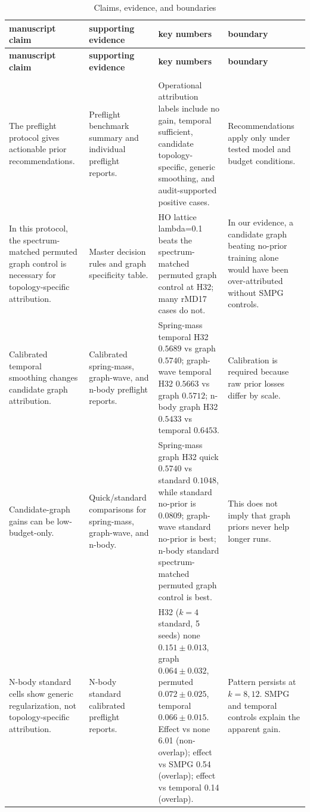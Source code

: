 \documentclass[preprint,12pt]{elsarticle}
\begin{document}
\begingroup
\scriptsize
\setlength{\tabcolsep}{3pt}
\renewcommand{\arraystretch}{1.08}
\begin{longtable}{>{\raggedright\arraybackslash}p{}>{\raggedright\arraybackslash}p{}>{\raggedright\arraybackslash}p{}>{\raggedright\arraybackslash}p{}}
\caption{Claims, evidence, and boundaries}\label{tab:claims-evidence}\\
\toprule
\textbf{manuscript claim} & \textbf{supporting evidence} & \textbf{key numbers} & \textbf{boundary} \\
\midrule
\endfirsthead
\toprule
\textbf{manuscript claim} & \textbf{supporting evidence} & \textbf{key numbers} & \textbf{boundary} \\
\midrule
\endhead
\midrule
\multicolumn{4}{r}{\emph{Continued on next page}} \\
\midrule
\endfoot
\bottomrule
\endlastfoot
The preflight protocol gives actionable prior recommendations. & Preflight benchmark summary and individual preflight reports. & Operational attribution labels include no gain, temporal sufficient, candidate topology-specific, generic smoothing, and audit-supported positive cases. & Recommendations apply only under tested model and budget conditions. \\
In this protocol, the spectrum-matched permuted graph control is necessary for topology-specific attribution. & Master decision rules and graph specificity table. & HO lattice lambda=0.1 beats the spectrum-matched permuted graph control at H32; many rMD17 cases do not. & In our evidence, a candidate graph beating no-prior training alone would have been over-attributed without SMPG controls. \\
Calibrated temporal smoothing changes candidate graph attribution. & Calibrated spring-mass, graph-wave, and n-body preflight reports. & Spring-mass temporal H32 $0.5689$ vs graph $0.5740$; graph-wave temporal H32 $0.5663$ vs graph $0.5712$; n-body graph H32 $0.5433$ vs temporal $0.6453$. & Calibration is required because raw prior losses differ by scale. \\
Candidate-graph gains can be low-budget-only. & Quick/standard comparisons for spring-mass, graph-wave, and n-body. & Spring-mass graph H32 quick $0.5740$ vs standard $0.1048$, while standard no-prior is $0.0809$; graph-wave standard no-prior is best; n-body standard spectrum-matched permuted graph control is best. & This does not imply that graph priors never help longer runs. \\
N-body standard cells show generic regularization, not topology-specific attribution. & N-body standard calibrated preflight reports. & H32 ($k=4$ standard, 5 seeds) none $0.151 \pm 0.013$, graph $0.064 \pm 0.032$, permuted $0.072 \pm 0.025$, temporal $0.066 \pm 0.015$. Effect vs none 6.01 (non-overlap); effect vs SMPG 0.54 (overlap); effect vs temporal 0.14 (overlap). & Pattern persists at $k=8,12$. SMPG and temporal controls explain the apparent gain. \\

\end{longtable}
\end{document}
